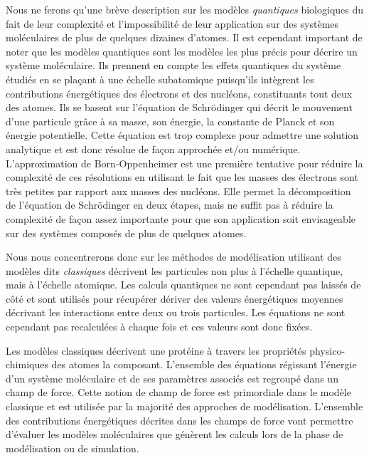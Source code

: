  \label{quantic}

Nous ne ferons qu'une brève description sur les modèles \textit{quantiques} biologiques du fait de leur complexité et l'impossibilité de leur application sur des systèmes moléculaires de plus de quelques dizaines d'atomes. Il est cependant important de noter que les modèles quantiques sont les modèles les plus précis pour décrire un système moléculaire. Ils prennent en compte les effets quantiques du système étudiés en se plaçant à une échelle subatomique puisqu'ils intègrent les contributions énergétiques des électrons et des nucléons, constituants tout deux des atomes. Ils se basent sur l'équation de Schrödinger \cite{schrodinger1926undulatory} qui décrit le mouvement d'une particule grâce à sa masse, son énergie, la constante de Planck et son énergie potentielle. Cette équation est trop complexe pour admettre une solution analytique et est donc résolue de façon approchée et/ou numérique. L'approximation de Born-Oppenheimer \cite{born1927quantentheorie} est une première tentative pour réduire la complexité de ces résolutions en utilisant le fait que les masses des électrons sont très petites par rapport aux masses des nucléons. Elle permet la décomposition de l'équation de Schrödinger en deux étapes, mais ne suffit pas à réduire la complexité de façon assez importante pour que son application soit envisageable sur des systèmes composés de plus de quelques atomes.

Nous nous concentrerons donc sur les méthodes de modélisation utilisant des modèles dits \textit{classiques} décrivent les particules non plus à l'échelle quantique, mais à l'échelle atomique. Les calculs quantiques ne sont cependant pas laissés de côté et sont utilisés pour récupérer dériver des valeurs énergétiques moyennes décrivant les interactions entre deux ou trois particules. Les équations ne sont cependant pas recalculées à chaque fois et ces valeurs sont donc fixées.

 \label{forcefield}

Les modèles classiques décrivent une protéine à travers les propriétés physico-chimiques des atomes la composant. L'ensemble des équations régissant l'énergie d'un système moléculaire et de ses paramètres associés est regroupé dans un champ de force. Cette notion de champ de force est primordiale dans le modèle classique et est utilisée par la majorité des approches de modélisation. L'ensemble des contributions énergétiques décrites dans les champs de force vont permettre d'évaluer les modèles moléculaires que génèrent les calculs lors de la phase de modélisation ou de simulation.

